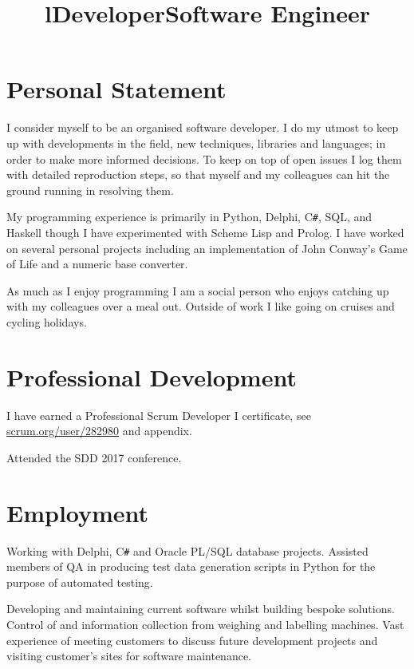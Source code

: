 \documentclass[line,margin]{res}
\title{l} \location{r} \\
\newcommand{\CSharp}{C\texttt{\#}}
\begin{document}
\begin{resume}
\section{Personal Statement}
I consider myself to be an organised software developer.
I do my utmost to keep up with developments in the field, new techniques, libraries and languages; in order to make more informed decisions.
To keep on top of open issues I log them with detailed reproduction steps, so that myself and my colleagues can hit the ground running in resolving them.

My programming experience is primarily in Python, Delphi, {\CSharp}, SQL, and Haskell though I have experimented with Scheme Lisp and Prolog.
I have worked on several personal projects including an implementation of John Conway's Game of Life and a numeric base converter.

As much as I enjoy programming I am a social person who enjoys catching up with my colleagues over a meal out.
Outside of work I like going on cruises and cycling holidays.

\section{Professional Development}
I have earned a Professional Scrum Developer I certificate, see \href{https://www.scrum.org/user/282980}{scrum.org/user/282980} and appendix.

Attended the SDD 2017 conference.

\section{Employment}

\title{Developer}
\begin{position}
Working with Delphi, {\CSharp} and Oracle PL/SQL database projects.
Assisted members of QA in producing test data generation scripts in Python for the purpose of automated testing.
\end{position}

\title{Software Engineer}
\begin{position}
Developing and maintaining current software whilst building bespoke solutions.
Control of and information collection from weighing and labelling machines.
Vast experience of meeting customers to discuss future development projects and visiting customer's sites for software maintenance.


\end{position}
\end{resume}
\end{document}
